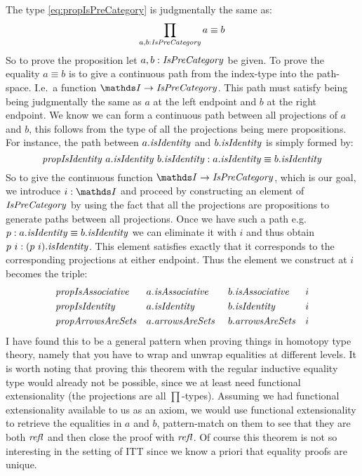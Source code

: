 The type \ref{eq:propIsPreCategory} is judgmentally the same as:
%
$$
\prod_{a, b \tp \IsPreCategory} a \equiv b
$$
%
So to prove the proposition let $a, b \tp \IsPreCategory$ be given. To
prove the equality $a \equiv b$ is to give a continuous path from the
index-type into the path-space. I.e.\ a function $\I \to
\IsPreCategory$. This path must satisfy being being judgmentally the
same as $a$ at the left endpoint and $b$ at the right endpoint. We
know we can form a continuous path between all projections of $a$ and
$b$, this follows from the type of all the projections being mere
propositions. For instance, the path between $a.\isIdentity$ and
$b.\isIdentity$ is simply formed by:
%
$$
\propIsIdentity\ a.\isIdentity\ b.\isIdentity
\tp
a.\isIdentity \equiv b.\isIdentity
$$
%
So to give the continuous function $\I \to \IsPreCategory$, which is our goal, we
introduce $i \tp \I$ and proceed by constructing an element of $\IsPreCategory$
by using the fact that all the projections are propositions to generate paths
between all projections. Once we have such a path e.g.\ $p \tp a.\isIdentity
\equiv b.\isIdentity$ we can eliminate it with $i$ and thus obtain $p\ i \tp
(p\ i).\isIdentity$. This element satisfies exactly that it corresponds to the
corresponding projections at either endpoint. Thus the element we construct at
$i$ becomes the triple:
%
\begin{equation}
\label{eq:proof-prop-IsPreCategory}
\begin{aligned}
  & \var{propIsAssociative} && a.\var{isAssociative}\
       && b.\var{isAssociative} && i  \\
  & \propIsIdentity    && a.\isIdentity\
       && b.\isIdentity    && i  \\
  & \var{propArrowsAreSets} && a.\var{arrowsAreSets}\
       && b.\var{arrowsAreSets} && i
\end{aligned}
\end{equation}
%
I have found this to be a general pattern when proving things in
homotopy type theory, namely that you have to wrap and unwrap
equalities at different levels. It is worth noting that proving this
theorem with the regular inductive equality type would already not be
possible, since we at least need functional
extensionality\index{functional extensionality} (the projections are
all $\prod$-types). Assuming we had functional extensionality
available to us as an axiom, we would use functional extensionality
\TODO{in reverse?} to retrieve the equalities in $a$ and $b$,
pattern-match on them to see that they are both $\refl$ and then close
the proof with $\refl$. Of course this theorem is not so interesting
in the setting of ITT since we know a priori that equality proofs are
unique.

